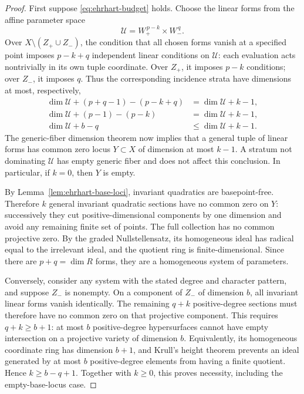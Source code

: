 \documentclass[11pt,a4paper]{article}
\theoremstyle{definition}
\theoremstyle{remark}\newtheorem{remark}[lemma]{Remark}
\begin{document}
\begin{proof}
First suppose \eqref{eq:ehrhart-budget} holds. Choose the linear forms
from the affine parameter space
\[
 \mathcal U=W_+^{\,p-k}\times W_-^{\,q}.
\]
Over $X\setminus(Z_+\cup Z_-)$, the condition that all chosen forms vanish
at a specified point imposes $p-k+q$ independent linear conditions on
$\mathcal U$: each evaluation acts nontrivially in its own tuple
coordinate. Over $Z_+$, it imposes $p-k$ conditions; over $Z_-$, it
imposes $q$. Thus the corresponding incidence strata have dimensions at
most, respectively,
\begin{align*}
 \dim\mathcal U+(p+q-1)-(p-k+q)&=\dim\mathcal U+k-1,\\
 \dim\mathcal U+(p-1)-(p-k)&=\dim\mathcal U+k-1,\\
 \dim\mathcal U+b-q&\leq\dim\mathcal U+k-1.
\end{align*}
The generic-fiber dimension theorem now implies that a general tuple of
linear forms has common zero locus $Y\subset X$ of dimension at most
$k-1$. A stratum not dominating $\mathcal U$ has empty generic fiber and
does not affect this conclusion. In particular, if $k=0$, then $Y$ is
empty.

By Lemma~\ref{lem:ehrhart-base-loci}, invariant quadratics are
basepoint-free. Therefore $k$ general invariant quadratic sections have
no common zero on $Y$: successively they cut positive-dimensional
components by one dimension and avoid any remaining finite set of
points. The full collection has no common projective zero. By the graded
Nullstellensatz, its homogeneous ideal has radical equal to the
irrelevant ideal, and the quotient ring is finite-dimensional. Since
there are $p+q=\dim R$ forms, they are a homogeneous system of parameters.

Conversely, consider any system with the stated degree and character
pattern, and suppose $Z_-$ is nonempty. On a component of $Z_-$ of
dimension $b$, all invariant linear forms vanish identically. The
remaining $q+k$ positive-degree sections must therefore have no common
zero on that projective component. This requires $q+k\geq b+1$: at most
$b$ positive-degree hypersurfaces cannot have empty intersection on a
projective variety of dimension $b$. Equivalently, its homogeneous
coordinate ring has dimension $b+1$, and Krull's height theorem prevents
an ideal generated by at most $b$ positive-degree elements from having a
finite quotient. Hence $k\geq b-q+1$. Together with $k\geq0$, this proves
necessity, including the empty-base-locus case.
\end{proof}
\end{document}
